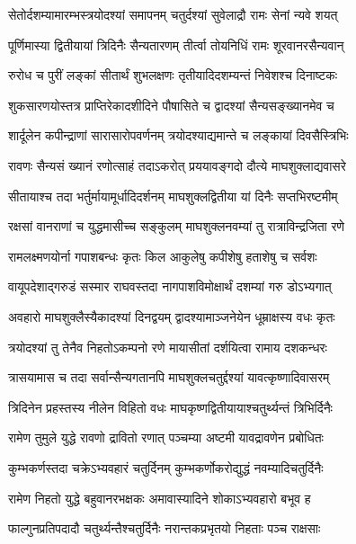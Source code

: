 \twolineshloka
{सेतोर्दशम्यामारम्भस्त्रयोदश्यां समापनम्}
{चतुर्दश्यां सुवेलाद्रौ रामः सेनां न्यवे शयत्}%

\twolineshloka
{पूर्णिमास्या द्वितीयायां त्रिदिनैः सैन्यतारणम्}
{तीर्त्वा तोयनिधिं रामः शूरवानरसैन्यवान्}%

\twolineshloka
{रुरोध च पुरीं लङ्कां सीतार्थं शुभलक्षणः}
{तृतीयादिदशम्यन्तं निवेशश्च दिनाष्टकः}%

\twolineshloka
{शुकसारणयोस्तत्र प्राप्तिरेकादशीदिने}
{पौषासिते च द्वादश्यां सैन्यसङ्ख्यानमेव च}%

\twolineshloka
{शार्दूलेन कपीन्द्राणां सारासारोपवर्णनम्}
{त्रयोदश्याद्यमान्ते च लङ्कायां दिवसैस्त्रिभिः}%

\twolineshloka
{रावणः सैन्यसं ख्यानं रणोत्साहं तदाऽकरोत्}
{प्रययावङ्गदो दौत्ये माघशुक्लाद्यवासरे}%

\twolineshloka
{सीतायाश्च तदा भर्तुर्मायामूर्धादिदर्शनम्}
{माघशुक्लद्वितीया यां दिनैः सप्तभिरष्टमीम्}%

\twolineshloka
{रक्षसां वानराणां च युद्धमासीच्च सङ्कुलम्}
{माघशुक्लनवम्यां तु रात्राविन्द्रजिता रणे}%

\twolineshloka
{रामलक्ष्मणयोर्ना गपाशबन्धः कृतः किल}
{आकुलेषु कपीशेषु हताशेषु च सर्वशः}%

\twolineshloka
{वायूपदेशाद्गरुडं सस्मार राघवस्तदा}
{नागपाशविमोक्षार्थं दशम्यां गरु डोऽभ्यगात्}%

\twolineshloka
{अवहारो माघशुक्लैस्यैकादश्यां दिनद्वयम्}
{द्वादश्यामाञ्जनेयेन धूम्राक्षस्य वधः कृतः}%

\twolineshloka
{त्रयोदश्यां तु तेनैव निहतोऽकम्पनो रणे}
{मायासीतां दर्शयित्वा रामाय दशकन्धरः}%

\twolineshloka
{त्रासयामास च तदा सर्वान्सैन्यगतानपि}
{माघशुक्लचतुर्द्दश्यां यावत्कृष्णादिवासरम्}%

\twolineshloka
{त्रिदिनेन प्रहस्तस्य नीलेन विहितो वधः}
{माघकृष्णद्वितीयायाश्चतुर्थ्यन्तं त्रिभिर्दिनैः}%

\twolineshloka
{रामेण तुमुले युद्धे रावणो द्रावितो रणात्}
{पञ्चम्या अष्टमी यावद्रावणेन प्रबोधितः}%

\twolineshloka
{कुम्भकर्णस्तदा चक्रेऽभ्यवहारं चतुर्दिनम्}
{कुम्भकर्णोकरोद्युद्धं नवम्यादिचतुर्दिनैः}%

\twolineshloka
{रामेण निहतो युद्धे बहुवानरभक्षकः}
{अमावास्यादिने शोकाऽभ्यवहारो बभूव ह}%

\twolineshloka
{फाल्गुनप्रतिपदादौ चतुर्थ्यन्तैश्चतुर्दिनैः}
{नरान्तकप्रभृतयो निहताः पञ्च राक्षसाः}%

